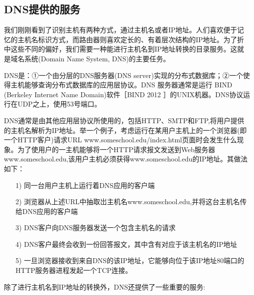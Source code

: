 \subsection{DNS提供的服务}

    我们刚刚看到了识别主机有两种方式，通过主机名或者IP地址。人们喜欢便于记忆的主机名标识方式，而路由器则喜欢定长的、有着层次结构的IP地址。为了折中这些不同的偏好，我们需要一种能进行主机名到IP地址转换的目录服务。这就是域名系统(Domain Name System, DNS)的主要任务。

    DNS是：①一个由分层的DNS服务器(DNS server)实现的分布式数据库；②一个使得主机能够查询分布式数据库的应用层协议。DNS 服务器通常是运行 BIND (Berkeley Internet Name Domain)软件［BIND 2012 ］的UNIX机器。DNS协议运行在UDP之上，使用53号端口。

    DNS通常是由其他应用层协议所使用的，包括HTTP、SMTP和FTP,将用户提供的主机名解析为IP地址。举一个例子，考虑运行在某用户主机上的一个浏览器(即一个HTTP客户)请求URL www.someschool.edu/index.html页面时会发生什么现象。为了使用户的一主机能够将一个HTTP请求报文发送到Web服务器www.someschool.edu,该用户主机必须获得www.someschool.edu的IP地址。其做法如下：

\begin{itemize}
    \item [1)] 同一台用户主机上运行着DNS应用的客户端
    \item [2)] 浏览器从上述URL中抽取岀主机名www.someschool.edu,并将这台主机名传给DNS应用的客户端
    \item [3)] DNS客户向DNS服务器发送一个包含主机名的请求
    \item [4)] DNS客户最终会收到一份回答报文，其中含有对应于该主机名的IP地址
    \item [5)] 一旦浏览器接收到来自DNS的该IP地址，它能够向位于该IP地址80端口的HTTP服务器进程发起一个TCP连接。
\end{itemize}

    除了进行主机名到IP地址的转换外，DNS还提供了一些重要的服务:


